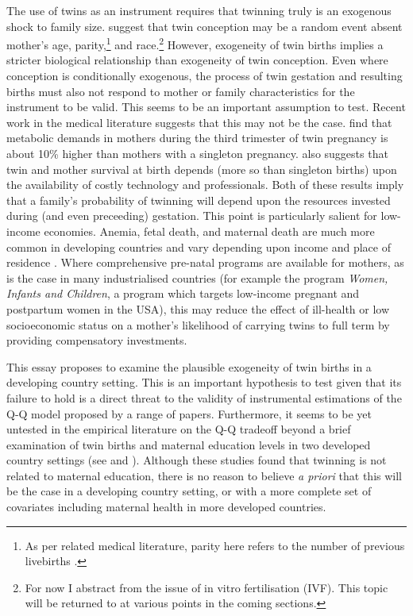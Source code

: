 \documentclass{article}[11pt,subeqn]
\begin{document}
\begin{spacing}{1.5}
The use of twins as an instrument requires that twinning truly is an exogenous shock to family size.  \citet{Kahnetal2003} suggest that twin conception may be a random event absent mother's age, 
parity,\footnote{As per related medical literature, parity here refers to the number of previous livebirths \citep{Elwood1978}.} and race.\footnote{For now I abstract from 
the issue of in vitro fertilisation (IVF).  This topic will be returned to at various points in the coming sections.} However, exogeneity of twin births implies a stricter 
biological relationship than exogeneity of twin conception.  Even where conception is conditionally exogenous, the process of twin gestation and resulting births must also 
not respond to mother or family characteristics for the instrument to be valid.  This seems to be an important assumption to test.  Recent work in the medical literature 
suggests that this may not be the case. \citet{Shinagawaetal2005} find that metabolic demands in mothers during the third trimester of twin pregnancy is about 10\% higher 
than mothers with a singleton pregnancy. \citet{Philipson2008}  also suggests that twin and mother survival at birth depends (more so than singleton births) upon the availability 
of costly technology and professionals.  Both of these results imply that a family's probability of twinning will depend upon the resources invested during (and even preceeding) 
gestation.  This point is particularly salient for low-income economies.  Anemia, fetal death, and maternal death are much more common in developing countries and vary depending 
upon income and place of residence \citep{Rush2000}.  Where comprehensive pre-natal programs are available for mothers, as is the case in many industrialised countries (for 
example the program \emph{Women, Infants and Children}, a program which targets low-income pregnant and postpartum women in the USA), this 
may reduce the effect of ill-health or low socioeconomic status on a mother's likelihood of carrying twins to full term by providing compensatory investments.

This essay proposes to examine the plausible exogeneity of twin births in a developing country setting.  This is an important hypothesis to test given that its failure to
hold is a direct threat to the validity of instrumental estimations of the Q-Q model proposed by a range of papers.  Furthermore, it seems to be yet untested in the
empirical literature on the Q-Q tradeoff beyond a brief examination of twin births and maternal education levels in two developed country settings (see \citet{Blacketal2005}
and \citet{Angristetal2010}).  Although these studies found that twinning is not related to maternal education, there is no reason to believe \emph{a priori} that this
will be the case in a developing country setting, or with a more complete set of covariates including maternal health in more developed countries. 


\end{spacing}
\end{document}
